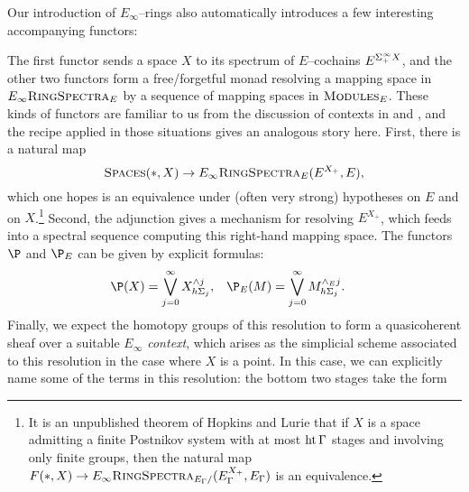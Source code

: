 Our introduction of $E_\infty$--rings also automatically introduces a few interesting accompanying functors:
\begin{center}
\end{center}
The first functor sends a space $X$ to its spectrum of $E$--cochains $E^{\Sigma^\infty_+ X}$, and the other two functors form a free/forgetful monad resolving a mapping space in $E_\infty\normalfont\textsc{RingSpectra}_E$ by a sequence of mapping spaces in $\normalfont\textsc{Modules}_E$.  These kinds of functors are familiar to us from the discussion of contexts in  and , and the recipe applied in those situations gives an analogous story here.  First, there is a natural map \[\normalfont\textsc{Spaces}(*, X) \to E_\infty\normalfont\textsc{RingSpectra}_E(E^{X_+}, E),\] which one hopes is an equivalence under (often very strong) hypotheses on $E$ and on $X$.\footnote{It is an unpublished theorem of Hopkins and Lurie that if $X$ is a space admitting a finite Postnikov system with at most $\operatorname{ht} \Gamma$ stages and involving only finite groups, then the natural map $F(*, X) \to E_\infty\normalfont\textsc{RingSpectra}_{E_\Gamma/}(E_\Gamma^{X_+}, E_\Gamma)$ is an equivalence.}  Second, the adjunction gives a mechanism for resolving $E^{X_+}$, which feeds into a spectral sequence computing this right-hand mapping space.  The functors $\P$ and $\P_E$ can be given by explicit formulas:
\begin{align*}
\P(X) & = \bigvee_{j=0}^\infty X^{\sm j}_{h\Sigma_j}, &
\P_E(M) & = \bigvee_{j=0}^\infty M^{\sm_E j}_{h\Sigma_j}.
\end{align*}
Finally, we expect the homotopy groups of this resolution to form a quasicoherent sheaf over a suitable \emph{$E_\infty$ context}, which arises as the simplicial scheme associated to this resolution in the case where $X$ is a point.  In this case, we can explicitly name some of the terms in this resolution: the bottom two stages take the form
\begin{center}
\end{center}
